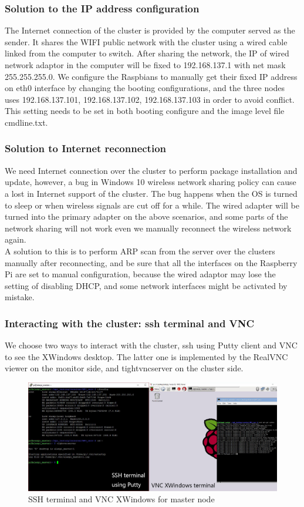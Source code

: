 \documentclass[11pt,openright,a4paper]{report}
\begin{document}
\subsubsection{Solution to the IP address configuration}
 The Internet connection of the cluster is provided by the computer served as the sender. It shares the WIFI public network with the cluster using a wired cable linked from the computer to switch. After sharing the network, the IP of wired network adaptor in the computer will be fixed to 192.168.137.1 with net mask 255.255.255.0. We configure the Raspbians to manually get their fixed IP address on eth0 interface by changing the booting configurations, and the three nodes uses 192.168.137.101, 192.168.137.102, 192.168.137.103 in order to avoid conflict. This setting needs to be set in both booting configure and the image level file cmdline.txt.\\
 \subsubsection{Solution to Internet reconnection}
 We need Internet connection over the cluster to perform package installation and update, however, a bug in Windows 10 wireless network sharing policy can cause a lost in Internet support of the cluster. The bug happens when the OS is turned to sleep or when wireless signals are cut off for a while. The wired adapter will be turned into the primary adapter on the above scenarios, and some parts of the network sharing will not work even we manually reconnect the wireless network again.\\
 A solution to this is to perform ARP scan from the server over the clusters manually after reconnecting, and be sure that all the interfaces on the Raspberry Pi are set to manual configuration, because the wired adaptor may lose the setting of disabling DHCP, and some network interfaces might be activated by mistake.\\
\subsubsection{Interacting with the cluster: ssh terminal and VNC}
We choose two ways to interact with the cluster, ssh using Putty client and VNC to see the XWindows desktop. The latter one is implemented by the RealVNC viewer on the monitor side\cite{realvnc}, and tightvncserver on the cluster side\cite{xtightvncserver}.\\
\begin{figure}[H]
\centering
\includegraphics[width=0.9\linewidth]{picture/terminal}
\caption{SSH terminal and VNC XWindows for master node}
\label{fig:terminal}
\end{figure}
\end{document}
